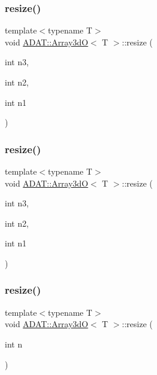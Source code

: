 \subsubsection{\texorpdfstring{resize()}{resize()}\hspace{0.1cm}{\footnotesize\ttfamily [2/6]}}
{\footnotesize\ttfamily template$<$typename T$>$ \\
void \mbox{\hyperlink{classADAT_1_1Array3dO}{A\+D\+A\+T\+::\+Array3dO}}$<$ T $>$\+::resize (\begin{DoxyParamCaption}\item[{int}]{n3,  }\item[{int}]{n2,  }\item[{int}]{n1 }\end{DoxyParamCaption})\hspace{0.3cm}{\ttfamily [inline]}}

\mbox{\label{classADAT_1_1Array3dO_ac2ad038aba5cf35770c319cb199cd438}} 
\subsubsection{\texorpdfstring{resize()}{resize()}\hspace{0.1cm}{\footnotesize\ttfamily [3/6]}}
{\footnotesize\ttfamily template$<$typename T$>$ \\
void \mbox{\hyperlink{classADAT_1_1Array3dO}{A\+D\+A\+T\+::\+Array3dO}}$<$ T $>$\+::resize (\begin{DoxyParamCaption}\item[{int}]{n3,  }\item[{int}]{n2,  }\item[{int}]{n1 }\end{DoxyParamCaption})\hspace{0.3cm}{\ttfamily [inline]}}

\mbox{\label{classADAT_1_1Array3dO_ade806f07a366f5217783998dda678b6f}} 
\subsubsection{\texorpdfstring{resize()}{resize()}\hspace{0.1cm}{\footnotesize\ttfamily [4/6]}}
{\footnotesize\ttfamily template$<$typename T$>$ \\
void \mbox{\hyperlink{classADAT_1_1Array3dO}{A\+D\+A\+T\+::\+Array3dO}}$<$ T $>$\+::resize (\begin{DoxyParamCaption}\item[{int}]{n }\end{DoxyParamCaption})\hspace{0.3cm}{\ttfamily [inline]}}

